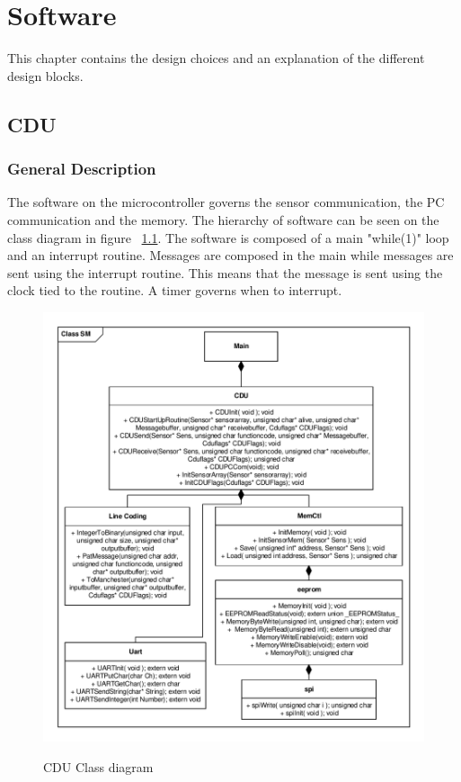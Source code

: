 \chapter{Software}
This chapter contains the design choices and an explanation of the different design blocks.

\section{CDU}
\subsection{General Description}
The software on the microcontroller governs the sensor communication, the PC communication and the memory. The hierarchy of software can be seen on the class diagram in figure ~\ref{fig:cduclassd}. The software is composed of a main "while(1)" loop and an interrupt routine. Messages are composed in the main while messages are sent using the interrupt routine. This means that the message is sent using the clock tied to the routine. A timer governs when to interrupt.\\

\begin{figure}[H]
\centering
\includegraphics[scale=0.8]{billeder/CDUClassDiagramme}
\label{fig:cduclassd}
\caption{CDU Class diagram}
\end{figure}
